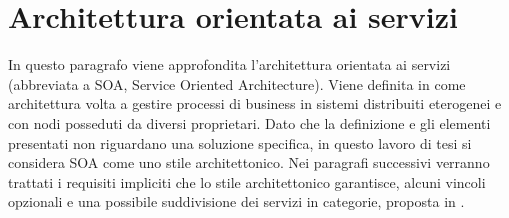 \documentclass[12pt]{report}
\begin{document}
\section{Architettura orientata ai servizi} \label{servizio}
In questo paragrafo viene approfondita l'architettura orientata ai servizi (abbreviata a SOA, Service Oriented Architecture).
Viene definita in \cite{josuttis_soa_2007} come architettura volta a gestire processi di business in sistemi distribuiti eterogenei e con nodi posseduti da diversi proprietari.
Dato che la definizione e gli elementi presentati non riguardano una soluzione specifica, in questo lavoro di tesi si considera SOA come uno stile architettonico.
Nei paragrafi successivi verranno trattati i requisiti impliciti che lo stile architettonico garantisce, alcuni vincoli opzionali e una possibile suddivisione dei servizi in categorie, proposta in \cite {josuttis_soa_2007}.
\end{document}
